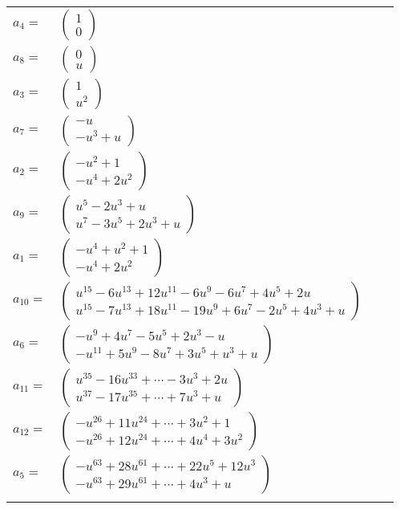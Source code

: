 \documentclass[1p]{elsarticle_modified}
\theoremstyle{definition}
\begin{document}
\begin{tabular}{m{7pt} m{180pt} m{7pt} m{180pt} }
\flushright $a_{4}=$&$\begin{pmatrix}1\\0\end{pmatrix}$ \\
\flushright $a_{8}=$&$\begin{pmatrix}0\\u\end{pmatrix}$ \\
\flushright $a_{3}=$&$\begin{pmatrix}1\\u^2\end{pmatrix}$ \\
\flushright $a_{7}=$&$\begin{pmatrix}- u\\- u^3+u\end{pmatrix}$ \\
\flushright $a_{2}=$&$\begin{pmatrix}- u^2+1\\- u^4+2 u^2\end{pmatrix}$ \\
\flushright $a_{9}=$&$\begin{pmatrix}u^5-2 u^3+u\\u^7-3 u^5+2 u^3+u\end{pmatrix}$ \\
\flushright $a_{1}=$&$\begin{pmatrix}- u^4+u^2+1\\- u^4+2 u^2\end{pmatrix}$ \\
\flushright $a_{10}=$&$\begin{pmatrix}u^{15}-6 u^{13}+12 u^{11}-6 u^9-6 u^7+4 u^5+2 u\\u^{15}-7 u^{13}+18 u^{11}-19 u^9+6 u^7-2 u^5+4 u^3+u\end{pmatrix}$ \\
\flushright $a_{6}=$&$\begin{pmatrix}- u^9+4 u^7-5 u^5+2 u^3- u\\- u^{11}+5 u^9-8 u^7+3 u^5+u^3+u\end{pmatrix}$ \\
\flushright $a_{11}=$&$\begin{pmatrix}u^{35}-16 u^{33}+\cdots-3 u^3+2 u\\u^{37}-17 u^{35}+\cdots+7 u^3+u\end{pmatrix}$ \\
\flushright $a_{12}=$&$\begin{pmatrix}- u^{26}+11 u^{24}+\cdots+3 u^2+1\\- u^{26}+12 u^{24}+\cdots+4 u^4+3 u^2\end{pmatrix}$ \\
\flushright $a_{5}=$&$\begin{pmatrix}- u^{63}+28 u^{61}+\cdots+22 u^5+12 u^3\\- u^{63}+29 u^{61}+\cdots+4 u^3+u\end{pmatrix}$\\&\end{tabular}
\end{document}

